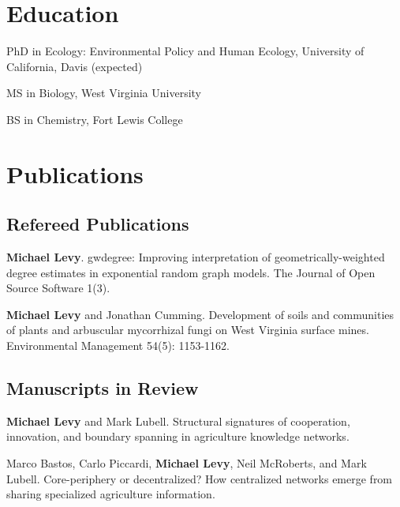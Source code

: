 \section{Education}\label{education}

\begin{description}
\tightlist
\item[2017]
PhD in Ecology: Environmental Policy and Human Ecology, University of
California, Davis (expected)
\item[2012]
MS in Biology, West Virginia University
\item[2004]
BS in Chemistry, Fort Lewis College
\end{description}

\section{Publications}\label{publications}

\subsection{Refereed Publications}\label{refereed-publications}

\begin{description}
\tightlist
\item[2016]
\textbf{Michael Levy}. gwdegree: Improving interpretation of
geometrically-weighted degree estimates in exponential random graph
models. The Journal of Open Source Software 1(3).
\item[2014]
\textbf{Michael Levy} and Jonathan Cumming. Development of soils and
communities of plants and arbuscular mycorrhizal fungi on West Virginia
surface mines. Environmental Management 54(5): 1153-1162.
\end{description}

\subsection{Manuscripts in Review}\label{manuscripts-in-review}

\begin{description}
\tightlist
\item[\phantom{2016}]
\textbf{Michael Levy} and Mark Lubell. Structural signatures of
cooperation, innovation, and boundary spanning in agriculture knowledge
networks.
\item[\phantom{2016}]
Marco Bastos, Carlo Piccardi, \textbf{Michael Levy}, Neil McRoberts, and
Mark Lubell. Core-periphery or decentralized? How centralized networks
emerge from sharing specialized agriculture information.
\end{description}

